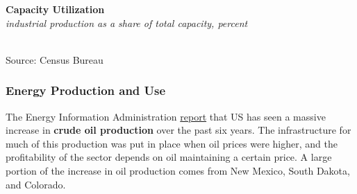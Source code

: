 \documentclass{report}
\makeatletter
\newcommand{\tbllink}[1]{\href{https://raw.githubusercontent.com/bdecon/US-chartbook/master/chartbook/data/#1}{\faTable}}
\newcommand*\short[1]{\expandafter\@gobbletwo\number\numexpr#1\relax}
\newcommand{\stdnode}[3]{\node[below, align=left, shift=({#1,#2})]{#3};}
\newcommand{\dateaxisticks}{
		date coordinates in=x, axis line style={draw=none},
		xmax={2021-05-15},
		max space between ticks=40,	    
		xtick={{1990-01-01}, {1992-01-01}, {1994-01-01}, 
			{1996-01-01}, {1998-01-01}, {2000-01-01}, 
			{2002-01-01}, {2004-01-01}, {2006-01-01},
			{2008-01-01}, {2010-01-01}, {2012-01-01}, {2014-01-01},
		    {2016-01-01}, {2018-01-01}, {2020-01-01}},
		minor xtick={{1989-01-01}, {1991-01-01}, {1993-01-01},
			{1995-01-01}, {1997-01-01}, {1999-01-01}, 
			{2001-01-01}, {2003-01-01}, {2005-01-01}, {2007-01-01},
		    {2009-01-01}, {2011-01-01}, {2013-01-01}, {2015-01-01},
		    {2017-01-01}, {2019-01-01}, {2021-01-01}},
		enlarge y limits={0.06}, enlarge x limits={0.01},
		}
\newcommand{\bbar}[2]{extra #1 ticks = {{#2}}, extra #1 tick labels = ,
		extra #1 tick style = {grid=major, grid style={thick, black!25}},}
\newcommand{\stdline}[4]{\addplot[very thick, no markers, color=#1] 
		table [x=#2, y=#3, col sep=comma] {#4};	}
\newcommand{\thinline}[4]{\addplot[no markers, color=#1] 
		table [x=#2, y=#3, col sep=comma] {#4};	}
\newcommand{\rbars}{
		\fill[color=black!10] (axis cs:{1990-07-01},\pgfkeysvalueof{/pgfplots/ymin}) rectangle 
			(axis cs:{1991-03-01}, \pgfkeysvalueof{/pgfplots/ymax});
		\fill[color=black!10] (axis cs:{2007-12-01},\pgfkeysvalueof{/pgfplots/ymin}) rectangle 
			(axis cs:{2009-07-01}, \pgfkeysvalueof{/pgfplots/ymax});
		\fill[color=black!10] (axis cs:{2001-03-01},\pgfkeysvalueof{/pgfplots/ymin}) rectangle 
			(axis cs:{2001-11-01}, \pgfkeysvalueof{/pgfplots/ymax});
		\fill[color=black!10] (axis cs:{2020-02-01},\pgfkeysvalueof{/pgfplots/ymin}) rectangle 
			(axis cs:{2021-05-15}, \pgfkeysvalueof{/pgfplots/ymax});}
\makeatother
\begin{document}
{\begin{minipage}{0.76\textwidth}
\normalsize \textbf{Capacity Utilization}\\
\footnotesize{\textit{industrial production as a share of total capacity, percent}}\\
\hspace*{-2mm} \\
\footnotesize{Source: Census Bureau} \hfill \tbllink{tcu.csv}
\end{minipage}
\newpage
\subsubsection*{\color{black!70} \seriffont Energy Production and Use}
\begin{minipage}{0.76\textwidth}
\small The Energy Information Administration \href{https://www.eia.gov/dnav/pet/pet_crd_crpdn_adc_mbblpd_m.htm}{report} that US has seen a massive increase in \textbf{crude oil production} over the past six years. The infrastructure for much of this production was put in place when oil prices were higher, and the profitability of the sector depends on oil maintaining a certain price. A large portion of the increase in oil production comes from New Mexico, South Dakota, and Colorado. 
\vspace{2mm}


\end{minipage}}
\end{document}
